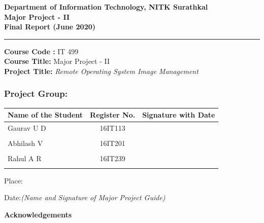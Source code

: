 \documentclass[a4paper,12pt]{article}
\begin{document}
\begin{center}
\textbf{\large{Department of Information Technology, NITK Surathkal}} \\

\textbf{\large{Major Project - II}} \\
\textbf{\large{Final Report (June 2020)}} \\
\noindent\rule{12cm}{0.4pt}
\end{center}


\noindent
\textbf{Course Code :} IT 499 \\
\textbf{Course Title:} Major Project - II \\
\textbf{Project Title:} \emph{Remote Operating System Image Management}   %

\subsubsection*{Project Group:}
\begin{tabular}{lcl}
\hline                         %
Name of the Student & Register No. & Signature with Date             \\
\hline
Gaurav U D            &16IT113        &                            \\\\
Abhilash V            &16IT201        &                            \\\\
Rahul A R            &16IT239        &                            \\\\
\hline
\end{tabular} 

\vspace{5 em}

Place:

Date:\hfill \textit{(Name and Signature of Major Project Guide)}


\newpage
\begin{center}
\textbf{\large{Acknowledgements}} \\
\end{center}
\end{document}
